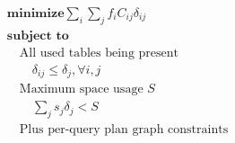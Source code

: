 \documentclass[preview,border=2pt]{standalone}
\begin{document}
\[
\renewcommand{\arraystretch}{1.2}
\begin{array}{l}
\displaystyle \textbf{minimize} \sum_i \sum_j f_i C_{ij} \delta_{ij} \\
\textbf{subject to} \\
\quad \text{All used tables being present} \\
\qquad \delta_{ij} \leq \delta_j, \forall{i, j} \\
\quad \text{Maximum space usage } S \\
\displaystyle \qquad \sum_j s_j \delta_j < S \\
\quad \text{Plus per-query plan graph constraints}
\end{array}
\]
\end{document}
